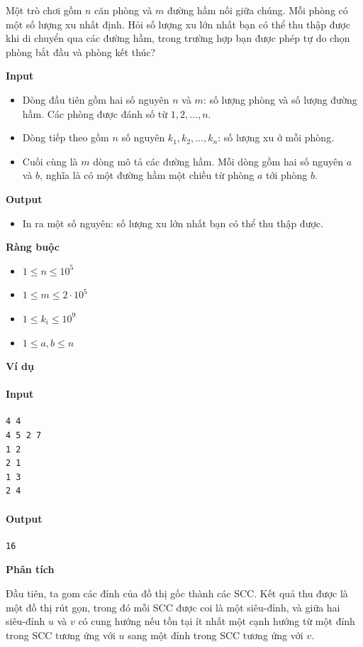 \documentclass{article}
\begin{document}
Một trò chơi gồm $n$ căn phòng và $m$ đường hầm nối giữa chúng. Mỗi phòng có một số lượng xu nhất định. Hỏi số lượng xu lớn nhất bạn có thể thu thập được khi di chuyển qua các đường hầm, trong trường hợp bạn được phép tự do chọn phòng bắt đầu và phòng kết thúc?

\textbf{Input}
\begin{itemize}
    \item Dòng đầu tiên gồm hai số nguyên $n$ và $m$: số lượng phòng và số lượng đường hầm. Các phòng được đánh số từ $1, 2, \ldots, n$.
    \item Dòng tiếp theo gồm $n$ số nguyên $k_1, k_2, \ldots, k_n$: số lượng xu ở mỗi phòng.
    \item Cuối cùng là $m$ dòng mô tả các đường hầm. Mỗi dòng gồm hai số nguyên $a$ và $b$, nghĩa là có một đường hầm một chiều từ phòng $a$ tới phòng $b$.
\end{itemize}

\textbf{Output}
\begin{itemize}
    \item In ra một số nguyên: số lượng xu lớn nhất bạn có thể thu thập được.
\end{itemize}

\textbf{Ràng buộc}
\begin{itemize}
    \item $1 \leq n \leq 10^5$
    \item $1 \leq m \leq 2 \cdot 10^5$
    \item $1 \leq k_i \leq 10^9$
    \item $1 \leq a, b \leq n$
\end{itemize}

\textbf{Ví dụ}

\paragraph{Input}
\begin{lstlisting}
4 4
4 5 2 7
1 2
2 1
1 3
2 4
\end{lstlisting}

\paragraph{Output}
\begin{lstlisting}
16
\end{lstlisting}

\textbf{Phân tích}

Đầu tiên, ta gom các đỉnh của đồ thị gốc thành các SCC. Kết quả thu được là một đồ thị rút gọn, trong đó mỗi SCC được coi là một siêu-đỉnh, và giữa hai siêu-đỉnh $u$ và $v$ có cung hướng nếu tồn tại ít nhất một cạnh hướng từ một đỉnh trong SCC tương ứng với $u$ sang một đỉnh trong SCC tương ứng với $v$.  
\end{document}
